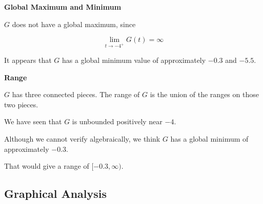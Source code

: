 \documentclass{ximera}
\begin{document}
\textbf{\textcolor{purple!85!blue}{Global Maximum and Minimum}} 

\begin{explanation}


$G$ does not have a global maximum, since 


\[
\lim\limits_{t \to -4^+} G(t) = \infty
\]



It appears that $G$ has a global minimum value of approximately $-0.3$ and $-5.5$.



\end{explanation}














\textbf{\textcolor{purple!85!blue}{Range}} 

\begin{explanation}

$G$ has three connected pieces.  The range of $G$ is the union of the ranges on those two pieces. 



We have seen that $G$ is unbounded positively near $-4$.  

Although we cannot verify algebraically, we think $G$ has a global minimum of approximately $-0.3$.


That would give a range of $[-0.3, \infty)$.



\end{explanation}















\subsection*{Graphical Analysis}
\end{document}
